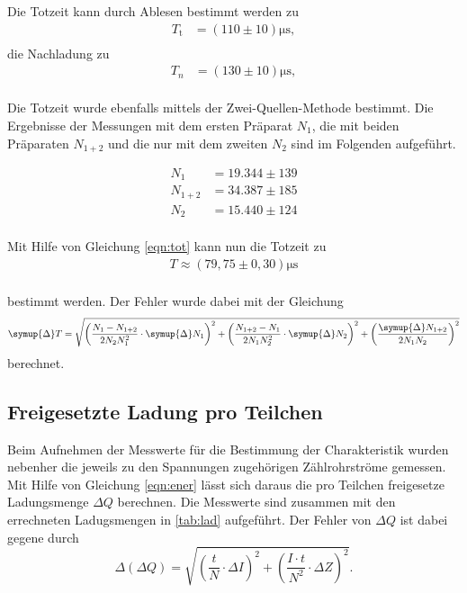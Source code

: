 Die Totzeit kann durch Ablesen bestimmt werden zu
\begin{align*}
  T_\text{t} &= (110 \pm 10) \si{\micro\second}, \\
\end{align*}
die Nachladung zu
\begin{align*}
  T_{n} &= (130 \pm 10) \si{\micro\second}, \\
\end{align*}



Die Totzeit wurde ebenfalls mittels der Zwei-Quellen-Methode bestimmt. Die Ergebnisse der Messungen mit dem ersten Präparat $N_1$, die mit beiden Präparaten
$N_{1+2}$ und die nur mit dem zweiten $N_2$ sind im Folgenden aufgeführt.

\begin{align*}
  N_1 &= 19.344 \pm 139 \\
  N_{1+2} &= 34.387 \pm 185 \\
  N_2 &= 15.440 \pm 124 \\
\end{align*}

Mit Hilfe von Gleichung \eqref{eqn:tot} kann nun die Totzeit zu
\begin{align*}
  T \approx (79,75 \pm 0,30)\si{\micro\second} \\
\end{align*}

bestimmt werden.
Der Fehler wurde dabei mit der Gleichung
\begin{equation*}
  \symup{\Delta}T = \sqrt{\left(\frac{N_1 - N_{1+2}}{2N_2 N_1^2} \cdot \symup{\Delta}N_1 \right)^2 + \left(\frac{N_{1+2} - N_{1}}{2N_1 N_2^2} \cdot \symup{\Delta}N_2 \right)^2
  + \left( \frac{\symup{\Delta}N_{1+2}}{2N_1 N_2}\right)^2} 
\end{equation*}
berechnet.

\subsection{Freigesetzte Ladung pro Teilchen}

Beim Aufnehmen der Messwerte für die Bestimmung der Charakteristik wurden nebenher die jeweils zu den Spannungen zugehörigen Zählrohrströme gemessen. Mit Hilfe von
Gleichung \eqref{eqn:ener} lässt sich daraus die pro Teilchen freigesetze Ladungsmenge $\Delta Q$ berechnen. Die Messwerte sind zusammen mit den errechneten Ladugsmengen in
\autoref{tab:lad} aufgeführt.
\newline
Der Fehler von $\Delta Q$ ist dabei gegene durch
\begin{equation*}
  \Delta (\Delta Q) = \sqrt{\left(\frac{t}{N} \cdot \Delta I \right)^2 + \left(\frac{I \cdot t}{N^2} \cdot \Delta Z\right)^2}.
\end{equation*}


